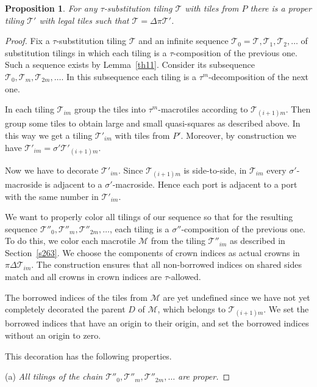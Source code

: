 \documentclass[12pt]{article}
\newtheorem{prop}{Proposition}
\theoremstyle{remark}
\begin{document}
\begin{prop}\label{th1}
For any $\tau$-substitution  tiling  $\mathcal T$ with tiles from $P$ there is 
a proper tiling $\mathcal T'$ with legal tiles such that $\mathcal T=\Delta\pi\mathcal T'$. 
\end{prop}
\begin{proof}
  Fix a $\tau$-substitution  tiling $\mathcal T$ and an infinite sequence $\mathcal T_0=\mathcal T, \mathcal T_1,\mathcal T_2,\dots$ of substitution tilings  in which each tiling is a $\tau$-composition of the previous one. 
Such a sequence exists by Lemma~\ref{th11}.
  Consider its subsequence $\mathcal T_0, \mathcal T_m,\mathcal T_{2m},\dots$.
In this subsequence each tiling is a $\tau^m$-decomposition of the next one.

In each tiling  $\mathcal T_{im}$ group the tiles into $\tau^m$-macrotiles according
to $\mathcal T_{(i+1)m}$. 
Then group some tiles to obtain large and small quasi-squares as described above. 
In this way we get a tiling  
$\mathcal T'_{im}$ with tiles from $P'$. 
Moreover, by construction we have $\mathcal T'_{im}=\sigma' \mathcal T'_{(i+1)m}$.

Now we have to decorate $\mathcal T'_{im}$. Since $\mathcal T_{(i+1)m}$ is side-to-side,
  in $\mathcal T_{im}$ every $\sigma'$-macroside is adjacent to a $\sigma'$-macroside. Hence 
each port is adjacent to a port with the same number in $\mathcal T'_{im}$.
  
  We want to properly color all tilings of our sequence so that for the resulting sequence
  $\mathcal T''_0, \mathcal T''_{m},\mathcal T''_{2m},\dots$, each tiling is a $\sigma''$-composition of the previous one. 
  To do this, we color each macrotile $\mathcal {M}$ from
the tiling $\mathcal T''_{im}$ as described in Section~\ref{s263}. 
We choose the components of 
crown indices as actual crowns in $\pi\Delta\mathcal T_{im}$. The construction ensures that
all non-borrowed indices on shared sides match and all crowns in crown indices are $\tau$-allowed. 

  The borrowed indices of the tiles from $\mathcal {M}$ are yet undefined since we have not yet completely decorated the parent $D$ of $\mathcal {M}$, which belongs to $\mathcal T_{(i+1)m}$.
  We set the borrowed indices that have an origin to their origin, and set the borrowed indices without an origin to zero.
  
  This decoration has the following properties.
 
  (a) \emph{All tilings of the chain $\mathcal T''_0, \mathcal T''_m,\mathcal T''_{2m},\dots$ are proper.}
  

\end{proof}
\end{document}
